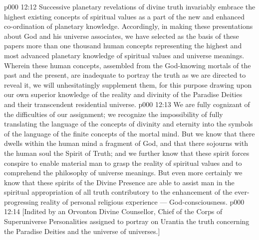\vs p000 12:12 Successive planetary revelations of divine truth invariably embrace the highest existing concepts of spiritual values as a part of the new and enhanced co\hyp{}ordination of planetary knowledge. Accordingly, in making these presentations about God and his universe associates, we have selected as the basis of these papers more than one thousand human concepts representing the highest and most advanced planetary knowledge of spiritual values and universe meanings. Wherein these human concepts, assembled from the God\hyp{}knowing mortals of the past and the present, are inadequate to portray the truth as we are directed to reveal it, we will unhesitatingly supplement them, for this purpose drawing upon our own superior knowledge of the reality and divinity of the Paradise Deities and their transcendent residential universe.
\vs p000 12:13 We are fully cognizant of the difficulties of our assignment; we recognize the impossibility of fully translating the language of the concepts of divinity and eternity into the symbols of the language of the finite concepts of the mortal mind. But we know that there dwells within the human mind a fragment of God, and that there sojourns with the human soul the Spirit of Truth; and we further know that these spirit forces conspire to enable material man to grasp the reality of spiritual values and to comprehend the philosophy of universe meanings. But even more certainly we know that these spirits of the Divine Presence are able to assist man in the spiritual appropriation of all truth contributory to the enhancement of the ever\hyp{}progressing reality of personal religious experience --- God\hyp{}consciousness.
\vsetoff
\vs p000 12:14 [Indited by an Orvonton Divine Counsellor, Chief of the Corps of Superuniverse Personalities assigned to portray on Urantia the truth concerning the Paradise Deities and the universe of universes.]
\quizlink
{}
